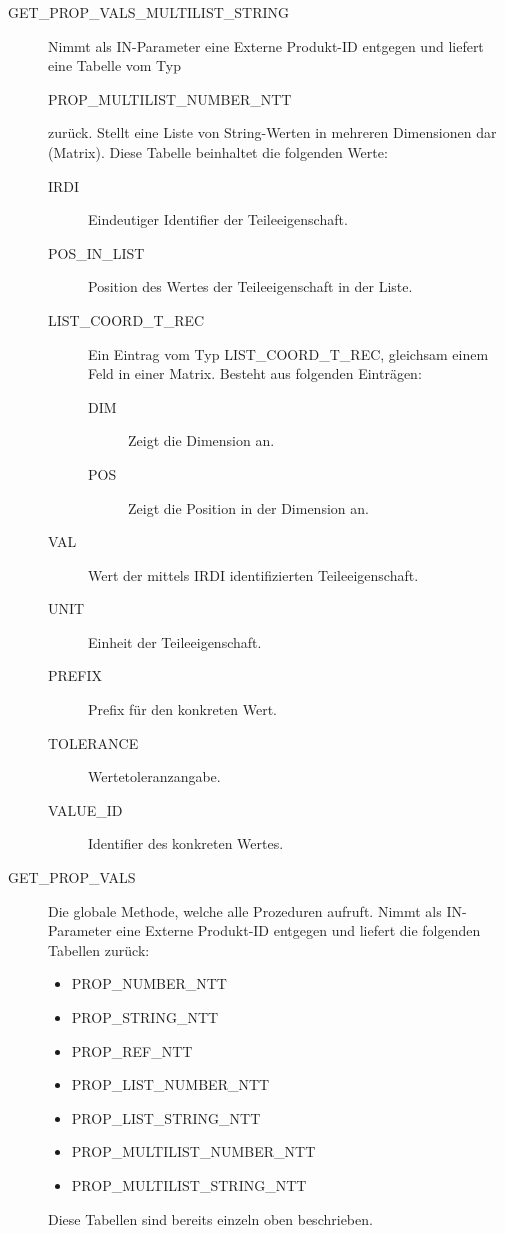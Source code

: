 \begin{description}
\item[GET\_PROP\_VALS\_MULTILIST\_STRING]  Nimmt als IN-Parameter eine Externe Produkt-ID entgegen und liefert eine Tabelle vom Typ 

PROP\_MULTILIST\_NUMBER\_NTT 

zurück. Stellt eine Liste von String-Werten in mehreren Dimensionen dar (Matrix). 
Diese Tabelle beinhaltet die folgenden Werte: 

  \begin{description}
  \item[IRDI] Eindeutiger Identifier der Teileeigenschaft.
  \item[POS\_IN\_LIST] Position des Wertes der Teileeigenschaft in der Liste.
  \item[LIST\_COORD\_T\_REC] Ein Eintrag vom Typ LIST\_COORD\_T\_REC, gleichsam einem Feld in einer Matrix. Besteht aus folgenden Einträgen:
    \begin{description}	
    \item[DIM] Zeigt die Dimension an.
    \item[POS] Zeigt die Position in der Dimension an. 
    \end{description}
  \item[VAL] Wert der mittels IRDI identifizierten Teileeigenschaft.
  \item[UNIT] Einheit der Teileeigenschaft.
  \item[PREFIX] Prefix für den konkreten Wert.
  \item[TOLERANCE] Wertetoleranzangabe.
  \item[VALUE\_ID] Identifier des konkreten Wertes.
  \end{description}
\item[GET\_PROP\_VALS] Die globale Methode, welche alle Prozeduren aufruft. Nimmt als IN-Parameter eine Externe Produkt-ID entgegen und liefert die folgenden Tabellen zurück:
\begin{itemize}
\item PROP\_NUMBER\_NTT
\item PROP\_STRING\_NTT
\item PROP\_REF\_NTT
\item PROP\_LIST\_NUMBER\_NTT
\item PROP\_LIST\_STRING\_NTT
\item PROP\_MULTILIST\_NUMBER\_NTT
\item PROP\_MULTILIST\_STRING\_NTT
\end{itemize} 

Diese Tabellen sind bereits einzeln oben beschrieben. 
\end{description}


